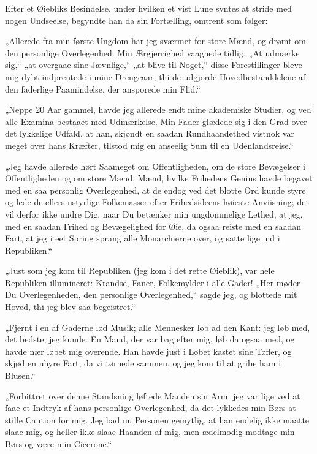 \documentclass[12pt,a4paper]{book}
\newcommand{\apage}[1]{\marginnote{\footnotesize\textit{[#1]}}}
\begin{document}
Efter et Øiebliks Besindelse, under hvilken et vist Lune syntes at
stride med nogen Undseelse, begyndte han da sin Fortælling, omtrent
som følger:

„Allerede fra min første Ungdom har jeg sværmet for store Mænd, og
drømt om den personlige Overlegenhed. Min Ærgjerrighed vaagnede
tidlig. „At udmærke sig,“ „at overgaae sine Jævnlige,“ „at blive til
Noget,“ disse Forestillinger bleve mig dybt indprentede i mine
Drengeaar, thi de udgjorde Hovedbestanddelene af den faderlige
Paamindelse, der ansporede min Flid.“

„Neppe 20 Aar gammel, havde jeg allerede endt mine akademiske
Studier, og ved alle Examina bestaaet med Udmærkelse. Min Fader
glædede sig i den Grad over det \apage{57}
lykkelige Udfald, at han, skjøndt en saadan Rundhaandethed vistnok
var meget over hans Kræfter, tilstod mig en anseelig Sum til en
Udenlandsreise.“

„Jeg havde allerede hørt Saameget om Offentligheden, om de store
Bevægelser i Offentligheden og om store Mænd, Mænd, hvilke Frihedens
Genius havde begavet med en saa personlig Overlegenhed, at de endog
ved det blotte Ord kunde styre og lede de ellers ustyrlige
Folkemasser efter Frihedsideens høieste Anviisning; det vil derfor
ikke undre Dig, naar Du betænker min ungdommelige Lethed, at jeg, med
en saadan Frihed og Bevægelighed for Øie, da ogsaa reiste med en
saadan Fart, at jeg i eet Spring sprang alle Monarchierne over, og
satte lige ind i Republiken.“

„Just som jeg kom til Republiken (jeg kom i det rette Øieblik), var
hele Republiken illumineret: Krandse, Faner, Folkemylder i alle
Gader! „Her møder Du Overlegenheden, den personlige Overlegenhed,“
sagde jeg, og blottede mit Hoved, thi jeg blev saa begeistret.“

„Fjernt i en af Gaderne lød Musik; alle Mennesker løb ad den Kant:
jeg løb med, det bedste, jeg kunde. En Mand, der var bag efter mig,
løb da ogsaa med, og havde nær løbet mig overende. Han havde just i
Løbet kastet sine Tøfler, og skjød en uhyre Fart, da vi tørnede
sammen, og jeg kom til at gribe ham i Blusen.“

„Forbittret over denne Standsning løftede Manden sin Arm: jeg var
lige ved at faae et Indtryk af hans personlige Overlegenhed, da det
lykkedes min Børs at stille Caution for mig. Jeg bad nu Personen
gemytlig, at han endelig ikke maatte slaae mig, og heller ikke slaae
Haanden af mig, men ædelmodig modtage min Børs og være min
Cicerone.“
\end{document}
